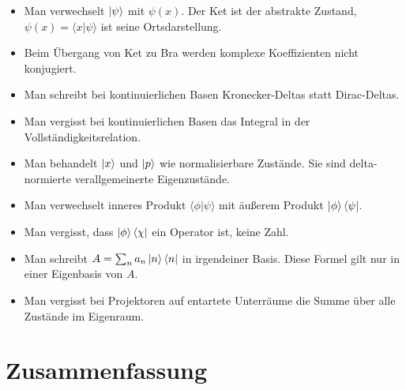 \begin{itemize}
    \item Man verwechselt $\left|\psi\right\rangle$ mit $\psi(x)$. Der Ket ist der abstrakte Zustand, $\psi(x)=\langle x|\psi\rangle$ ist seine Ortsdarstellung.
    \item Beim Übergang von Ket zu Bra werden komplexe Koeffizienten nicht konjugiert.
    \item Man schreibt bei kontinuierlichen Basen Kronecker-Deltas statt Dirac-Deltas.
    \item Man vergisst bei kontinuierlichen Basen das Integral in der Vollständigkeitsrelation.
    \item Man behandelt $\left|x\right\rangle$ und $\left|p\right\rangle$ wie normalisierbare Zustände. Sie sind delta-normierte verallgemeinerte Eigenzustände.
    \item Man verwechselt inneres Produkt $\langle\phi|\psi\rangle$ mit äußerem Produkt $\left|\phi\right\rangle\left\langle\psi\right|$.
    \item Man vergisst, dass $\left|\phi\right\rangle\left\langle\chi\right|$ ein Operator ist, keine Zahl.
    \item Man schreibt $A=\sum_n a_n\left|n\right\rangle\left\langle n\right|$ in irgendeiner Basis. Diese Formel gilt nur in einer Eigenbasis von $A$.
    \item Man vergisst bei Projektoren auf entartete Unterräume die Summe über alle Zustände im Eigenraum.
\end{itemize}

\section{Zusammenfassung}

